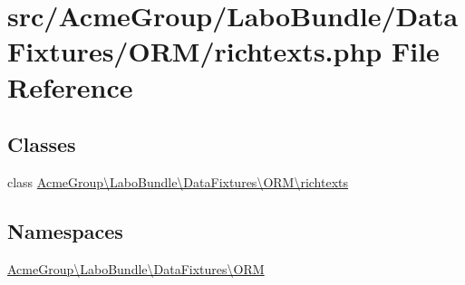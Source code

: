 \hypertarget{richtexts_8php}{\section{src/\+Acme\+Group/\+Labo\+Bundle/\+Data\+Fixtures/\+O\+R\+M/richtexts.php File Reference}
\label{richtexts_8php}
}
\subsection*{Classes}
\begin{DoxyCompactItemize}
\item 
class \hyperlink{class_acme_group_1_1_labo_bundle_1_1_data_fixtures_1_1_o_r_m_1_1richtexts}{Acme\+Group\textbackslash{}\+Labo\+Bundle\textbackslash{}\+Data\+Fixtures\textbackslash{}\+O\+R\+M\textbackslash{}richtexts}
\end{DoxyCompactItemize}
\subsection*{Namespaces}
\begin{DoxyCompactItemize}
\item 
 \hyperlink{namespace_acme_group_1_1_labo_bundle_1_1_data_fixtures_1_1_o_r_m}{Acme\+Group\textbackslash{}\+Labo\+Bundle\textbackslash{}\+Data\+Fixtures\textbackslash{}\+O\+R\+M}
\end{DoxyCompactItemize}
